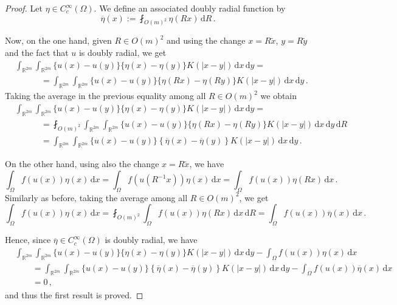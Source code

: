 \documentclass[12pt,reqno]{amsart}
\theoremstyle{definition}
\theoremstyle{remark}
\newcommand{\con}[1]{\mathbb{#1}}
\newcommand{\R}{\con{R}} %
\renewcommand{\d}{\,\mathrm{d}} %
\newcommand{\average}{\fint}
\numberwithin{equation}{section}
\begin{document}
	\begin{proof}
		Let $\eta \in C^\infty_c(\Omega)$. We define an associated doubly radial function by
		$$
		\overline{\eta}(x) := \average_{O(m)^2}\eta(R x)\d R\,.
		$$
		
		Now, on the one hand, given $R\in O(m)^2$ and using the change $x = R\tilde{x}$, $y = R \tilde{y}$ and the fact that $u$ is doubly radial, we get
		\begin{align*}
		&\int_{\R^{2m}}\int_{\R^{2m}} \{u(x)-u(y)\}\{\eta(x)-\eta(y)\} K(|x-y|) \d x \d y = \\
		&\quad \quad \quad = \int_{\R^{2m}}\int_{\R^{2m}} \{u(x)-u(y)\}\{\eta(R x)-\eta(R y)\} K(|x-y|) \d x \d y\,.
		\end{align*}
		Taking the average in the previous equality among all $R\in O(m)^2$ we obtain
		\begin{align*}
		& \int_{\R^{2m}}\int_{\R^{2m}} \{u(x)-u(y)\}\{\eta(x)-\eta(y)\} K(|x-y|) \d x \d y = \\
		&\quad \quad \quad =\average_{O(m)^2} \int_{\R^{2m}}\int_{\R^{2m}} \{u(x)-u(y)\}\{\eta(R x)-\eta(R y)\} K(|x-y|) \d x \d y \d R \\
		&\quad \quad \quad= \int_{\R^{2m}}\int_{\R^{2m}} \{u(x)-u(y)\}\left \{\overline{\eta}(x) -\overline{\eta}(y)  \right \} K(|x-y|) \d x \d y \,.
		\end{align*}
		
		On the other hand, using also the change $x = R\tilde{x}$, we have
		$$
		\int_{\Omega} f(u(x)) \eta(x) \d x = \int_{\Omega} f(u(R^{-1}x)) \eta(x) \d x = \int_{\Omega} f(u(x)) \eta(Rx) \d x\,.
		$$
		Similarly as before, taking the average among all $R\in O(m)^2$, we get
		$$
		\int_{\Omega} f(u(x)) \eta(x) \d x = \average_{O(m)^2} \int_{\Omega} f(u(x)) \eta(Rx) \d x \d R = \int_{\Omega} f(u(x))\overline{\eta}(x) \d x\,.
		$$
		
		Hence, since $\overline{\eta} \in C^\infty_c(\Omega)$ is doubly radial, we have
		\begin{align*}
		&\int_{\R^{2m}}\int_{\R^{2m}} \{u(x)-u(y)\}\{\eta(x)-\eta(y)\} K(|x-y|) \d x \d y - \int_{\Omega} f(u(x)) \eta(x) \d x \\
		&\quad \quad= \int_{\R^{2m}}\int_{\R^{2m}} \{u(x)-u(y)\}\left \{\overline{\eta}(x) -\overline{\eta}(y)  \right \} K(|x-y|) \d x \d y - \int_{\Omega} f(u(x))\overline{\eta}(x) \d x \\
		&\quad \quad= 0\,,
		\end{align*}
		and thus the first result is proved.
		

\end{proof}
\end{document}
